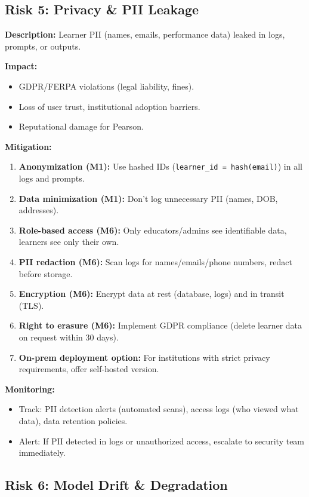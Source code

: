 \documentclass[11pt,letterpaper]{article}
\begin{document}
\subsection{Risk 5: Privacy \& PII Leakage}

\textbf{Description:} Learner PII (names, emails, performance data) leaked in logs, prompts, or outputs.

\textbf{Impact:}
\begin{itemize}
\item GDPR/FERPA violations (legal liability, fines).
\item Loss of user trust, institutional adoption barriers.
\item Reputational damage for Pearson.
\end{itemize}

\textbf{Mitigation:}
\begin{enumerate}
\item \textbf{Anonymization (M1):} Use hashed IDs (\texttt{learner\_id = hash(email)}) in all logs and prompts.
\item \textbf{Data minimization (M1):} Don't log unnecessary PII (names, DOB, addresses).
\item \textbf{Role-based access (M6):} Only educators/admins see identifiable data, learners see only their own.
\item \textbf{PII redaction (M6):} Scan logs for names/emails/phone numbers, redact before storage.
\item \textbf{Encryption (M6):} Encrypt data at rest (database, logs) and in transit (TLS).
\item \textbf{Right to erasure (M6):} Implement GDPR compliance (delete learner data on request within 30 days).
\item \textbf{On-prem deployment option:} For institutions with strict privacy requirements, offer self-hosted version.
\end{enumerate}

\textbf{Monitoring:}
\begin{itemize}
\item Track: PII detection alerts (automated scans), access logs (who viewed what data), data retention policies.
\item Alert: If PII detected in logs or unauthorized access, escalate to security team immediately.
\end{itemize}

\subsection{Risk 6: Model Drift \& Degradation}
\end{document}
